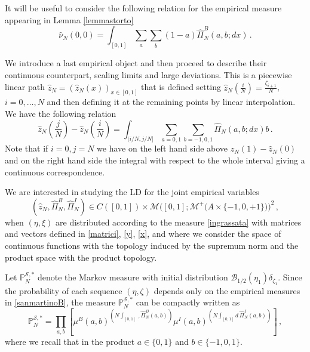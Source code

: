 \documentclass[reqno]{amsart}
\theoremstyle{plain}
\theoremstyle{definition}
\theoremstyle{remark}
\numberwithin{equation}{section}
\numberwithin{theorem}{section}
\renewcommand{\hat}{\widehat}
\newcommand{\<}{\langle}
\renewcommand{\>}{\rangle}
\begin{document}
	It will be useful to consider the following relation for the empirical measure appearing in Lemma \ref{lemmastorto}
	\begin{equation}\label{bunny}
		\hat \nu_N(0,0)=\int_{[0,1]} \sum_a \sum_{ b}(1-a)\hat \Pi_N^B(a,b; dx)\,.
	\end{equation}
	
	We introduce a last empirical object and then proceed to describe their continuous counterpart, scaling limits and large deviations. This is a piecewise linear path $\hat z_N=\left(\hat z_N(x)\right)_{x\in[0,1]}$ that is defined setting $\hat z_N\left(\frac iN\right)=\frac{\zeta_{i+1}}{N}$, $i=0, \dots , N$ and then defining it at the remaining points by linear interpolation. We have the following relation
	\begin{equation}\label{calcint}
		\hat z_N\left(\frac jN\right)-\hat z_N\left(\frac iN\right)=\int_{(i/N,j/N]}\sum_{a=0,1}\sum_{ b=-1,0,1}\hat{\Pi}_N(a,b; dx)b\,.
	\end{equation}
	Note that if $i=0, j=N$ we have on the left hand side above $\hat z_N(1)-\hat z_N(0)$ and on the right hand side
	the integral with respect to the whole interval giving a continuous correspondence.
	
	\smallskip
	
	We are interested in studying the LD for the joint empirical variables 
	\begin{equation}\label{empvar}
		\left(\hat z_N,\hat{\Pi}_N^B,\hat{\Pi}_N^I\right)\in C([0,1])\times\mathcal M\Big([0,1]; \mathcal M^+\big(A\times\{-1,0,+1\}\big)\Big)^2 \,,
	\end{equation}
	when $(\eta,\xi)$ are distributed according to the measure \eqref{ingrassata} with matrices and vectors defined in \eqref{matrici}, \eqref{y}, \eqref{x}, and where we consider the space of continuous functions with the topology induced by the supremum norm and the product space with the product topology.
	
    Let $\mathbb P^{\mathcal S,*}_N$ denote the Markov measure with initial distribution $\mathcal B_{1/2}(\eta_1)\delta_{\zeta_1}$. Since the probability of each sequence $(\eta,\zeta)$ depends only on the empirical measures in \eqref{sanmartinoB}, the measure $\mathbb P^{\mathcal S,*}_N$ can be compactly written as
	\begin{equation}\label{bellama}
		\mathbb P^{\mathcal S,*}_N=\prod_{a,b}\left[\mu^B(a,b)^{\left(N\int_{[0,1]}\,,\hat{\Pi}^B_N(a,b)\right)}
		\mu^I(a,b)^{\left(N\int_{[0,1]}d\,\hat{\Pi}^I_N(a,b)\right)}\right]\,,
	\end{equation}
	where we recall that in the product $a\in\{0,1\}$ and $b\in\{-1,0,1\}$.
	
\end{document}
